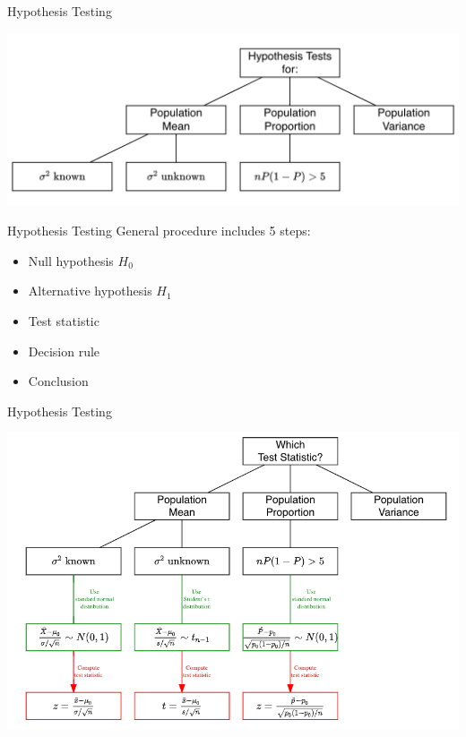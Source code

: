 \documentclass[
  10pt,
  ignorenonframetext,
]{beamer}
\providecommand{\tightlist}{%
  \setlength{\itemsep}{0pt}\setlength{\parskip}{0pt}}
\begin{document}
\begin{frame}{Hypothesis Testing}
\protect\hypertarget{hypothesis-testing}{}
\begin{center}\includegraphics[width=0.9\linewidth]{pictures/HypothesisTestObj} \end{center}
\end{frame}

\begin{frame}{Hypothesis Testing}
\protect\hypertarget{hypothesis-testing-1}{}
General procedure includes 5 steps:

\begin{itemize}
\tightlist
\item
  Null hypothesis \(H_0\)
\item
  Alternative hypothesis \(H_1\)
\item
  Test statistic
\item
  Decision rule
\item
  Conclusion
\end{itemize}
\end{frame}

\begin{frame}{Hypothesis Testing}
\protect\hypertarget{hypothesis-testing-2}{}
\begin{center}\includegraphics[width=0.9\linewidth]{pictures/HypothesisTestsGuide} \end{center}
\end{frame}
\end{document}
